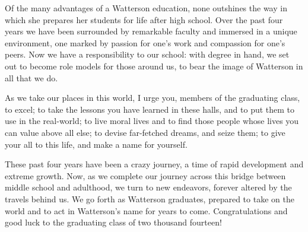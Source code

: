 \documentclass{report}
\begin{document}
Of the many advantages of a Watterson education, none outshines the way in
which she prepares her students for life after high school. Over the past four
years we have been surrounded by remarkable faculty and immersed in a unique
environment, one marked by passion for one's work and compassion for one's
peers. Now we have a responsibility to our school: with degree in hand, we set
out to become role models for those around us, to bear the image of Watterson
in all that we do.

As we take our places in this world, I urge you, members of the graduating
class, to excel; to take the lessons you have learned in these halls, and to
put them to use in the real-world; to live moral lives and to find those people
whose lives you can value above all else; to devise far-fetched dreams, and
seize them; to give your all to this life, and make a name for yourself.

These past four years have been a crazy journey, a time of rapid development
and extreme growth. Now, as we complete our journey across this bridge between
middle school and adulthood, we turn to new endeavors, forever altered by the
travels behind us. We go forth as Watterson graduates, prepared to take on the
world and to act in Watterson's name for years to come. Congratulations and
good luck to the graduating class of two thousand fourteen!
\end{document}

